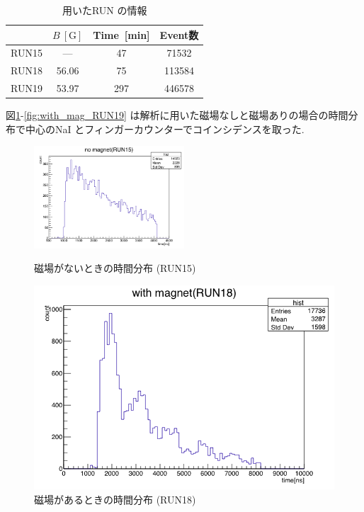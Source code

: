 \begin{table}[H]%
\caption{用いたRUN の情報}
\centering
\begin{tabular}{cccc}\toprule
{} & $B~[\mathrm{G}]$ & Time~[min] & Event数\\ \midrule
RUN15 & --- & 47 & 71532 \\
RUN18 & 56.06 & 75 & 113584 \\
RUN19 & 53.97 & 297 & 446578 \\ \bottomrule
\end{tabular}
\label{tab:RUN_info}
\end{table}

図\ref{fig:no_mag}-\ref{fig:with_mag_RUN19} は解析に用いた磁場なしと磁場ありの場合の時間分布で中心のNaI とフィンガーカウンターでコインシデンスを取った.
\begin{figure}[H]
\centering
\includegraphics[width  = 0.5\textwidth]{figure/mino/no_mag.png}
\caption{磁場がないときの時間分布 (RUN15)}
\label{fig:no_mag}
\begin{minipage}{0.45\hsize}
\centering
\includegraphics[width  = 1.0\textwidth]{figure/mino/with_mag_RUN18.png}
\caption{磁場があるときの時間分布 (RUN18)}
\end{minipage}

\end{figure}
